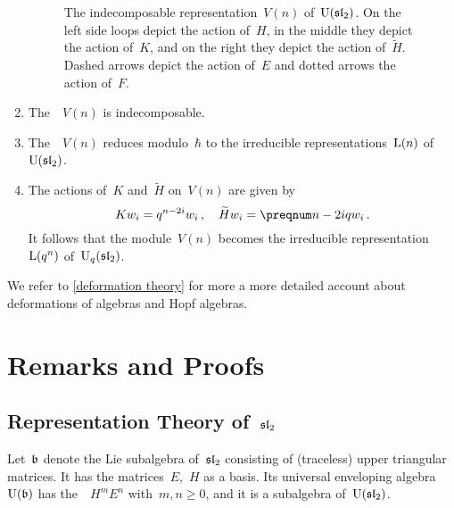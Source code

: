\documentclass[a4paper, 11pt, oneside]{scrartcl}
\begin{document}
\begin{theorem}
\begin{enumerate}
\begin{figure}
\begin{center}
\begin{tikzpicture}[
              yscale = 1.3,
              bendy/.style = {bend right = 25},
              loopy/.style = {out = 190, in = 170, looseness = 40}
            ]
          \end{tikzpicture}
        \end{center}
        \caption{%
          The indecomposable representation~$V(n)$ of~$\Univ(\sllie_2)$.
          On the left side loops depict the action of~$H$, in the middle they depict the action of~$K$, and on the right they depict the action of~$\widetilde{H}$.
          Dashed arrows depict the action of~$E$ and dotted arrows the action of~$F$.
        }
        \label{graphical representation of deformed representations}
      \end{figure}
    \item
      The~~$V(n)$ is indecomposable.
    \item
      The~~$V(n)$ reduces modulo~$\hbar$ to the irreducible representations~$\irred(n)$ of~$\Univ(\sllie_2)$.
    \item
      The actions of~$K$ and~$\widetilde{H}$ on~$V(n)$ are given by
      \[
        K w_i
        =
        q^{n - 2i} w_i \,,
        \quad
        \widetilde{H} w_i
        =
        \qnum{n - 2i} w_i \,.
      \]
      It follows that the module~$V(n)$ becomes the irreducible representation~$\irred(q^n)$ of~$\Univ_q(\sllie_2)$.
  \end{enumerate}
\end{theorem}

We refer to \cref{deformation theory} for more a more detailed account about deformations of algebras and Hopf algebras.





\clearpage
\appendix





\section{Remarks and Proofs}



\subsection{Representation Theory of~$\sllie_2$}
\label{appendix representation theory of sl2}

Let~$\blie$ denote the Lie subalgebra of~$\sllie_2$ consisting of (traceless) upper triangular matrices.
It has the matrices~$E$,~$H$ as a basis.
Its universal enveloping algebra~$\Univ(\blie)$ has the~{\PBWbasis}~$H^m E^n$ with~$m, n \geq 0$, and it is a subalgebra of~$\Univ(\sllie_2)$.
\end{document}
